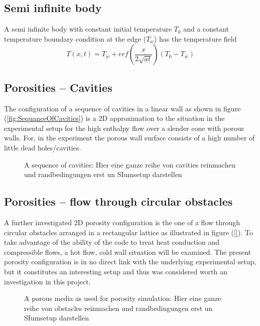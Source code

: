 \documentclass{report}
\begin{document}
\subsection{Semi infinite body}
\label{sec:genIntroSemiInfBody}
A semi infinite body with constant initial temperature $T_0$  and a constant temperature boundary condition at the edge ($T_w$) has the temperature field \cite{Carslaw1959}
\begin{equation}
\label{eq:SemiInfBodySolution}
 T(x,t)=T_w+erf \left(\frac{x}{2 \sqrt{at}} \right) \left(T_0-T_w \right)
\end{equation}


\subsection{Porosities -- Cavities}
\label{sec:Porosities_Cavity}
The configuration of a sequence of cavities in a linear wall as shown in figure (\ref{fig:SequanceOfCavities}) is a 2D approximation to the situation in the experimental setup for the high enthalpy flow over a slender cone with porous walls. For, in the experiment the porous wall surface consists of a high number of little dead holes/cavities.

\begin{figure}[!htbp]
  \centering
  \caption{A sequence of cavities: Hier eine ganze reihe von cavities reinmachen und randbedingungen erst un SIumsetup darstellen }
  \label{fig:PorositiesSequenceOfCavities}
\end{figure}


\subsection{Porosities -- flow through circular obstacles}
\label{sec:PorositiesCircularObstacles}
A further investigated 2D porosity configuration is the one of a flow through circular obstacles arranged in a rectangular lattice as illustrated in figure (\ref{}). To take advantage of the ability of the code to treat heat conduction and compressible flows, a hot flow, cold wall situation will be examined. The present porosity configuration is in no direct link with the underlying experimental setup, but it constitutes an interesting setup and thus was considered worth an investigation in this project. 

\begin{figure}[!htbp]
  \centering
  \caption{A porous media as used for porosity simulation: Hier eine ganze reihe von obstacles reinmachen und randbedingungen erst un SIumsetup darstellen }
  \label{fig:PorositiesCircularObstacles}
\end{figure}
\end{document}
